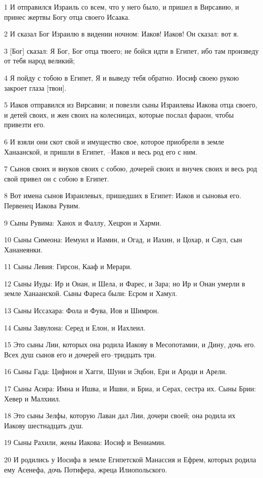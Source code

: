 \par 1 И отправился Израиль со всем, что у него было, и пришел в Вирсавию, и принес жертвы Богу отца своего Исаака.
\par 2 И сказал Бог Израилю в видении ночном: Иаков! Иаков! Он сказал: вот я.
\par 3 [Бог] сказал: Я Бог, Бог отца твоего; не бойся идти в Египет, ибо там произведу от тебя народ великий;
\par 4 Я пойду с тобою в Египет, Я и выведу тебя обратно. Иосиф своею рукою закроет глаза [твои].
\par 5 Иаков отправился из Вирсавии; и повезли сыны Израилевы Иакова отца своего, и детей своих, и жен своих на колесницах, которые послал фараон, чтобы привезти его.
\par 6 И взяли они скот свой и имущество свое, которое приобрели в земле Ханаанской, и пришли в Египет, --Иаков и весь род его с ним.
\par 7 Сынов своих и внуков своих с собою, дочерей своих и внучек своих и весь род свой привел он с собою в Египет.
\par 8 Вот имена сынов Израилевых, пришедших в Египет: Иаков и сыновья его. Первенец Иакова Рувим.
\par 9 Сыны Рувима: Ханох и Фаллу, Хецрон и Харми.
\par 10 Сыны Симеона: Иемуил и Иамин, и Огад, и Иахин, и Цохар, и Саул, сын Хананеянки.
\par 11 Сыны Левия: Гирсон, Кааф и Мерари.
\par 12 Сыны Иуды: Ир и Онан, и Шела, и Фарес, и Зара; но Ир и Онан умерли в земле Ханаанской. Сыны Фареса были: Есром и Хамул.
\par 13 Сыны Иссахара: Фола и Фува, Иов и Шимрон.
\par 14 Сыны Завулона: Серед и Елон, и Иахлеил.
\par 15 Это сыны Лии, которых она родила Иакову в Месопотамии, и Дину, дочь его. Всех душ сынов его и дочерей его--тридцать три.
\par 16 Сыны Гада: Цифион и Хагги, Шуни и Эцбон, Ери и Ароди и Арели.
\par 17 Сыны Асира: Имна и Ишва, и Ишви, и Бриа, и Серах, сестра их. Сыны Брии: Хевер и Малхиил.
\par 18 Это сыны Зелфы, которую Лаван дал Лии, дочери своей; она родила их Иакову шестнадцать душ.
\par 19 Сыны Рахили, жены Иакова: Иосиф и Вениамин.
\par 20 И родились у Иосифа в земле Египетской Манассия и Ефрем, которых родила ему Асенефа, дочь Потифера, жреца Илиопольского.
